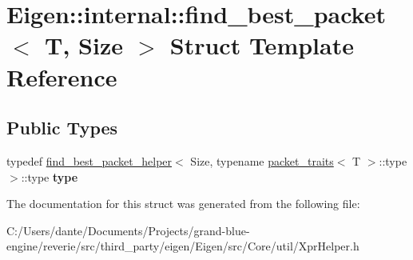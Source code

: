 \hypertarget{struct_eigen_1_1internal_1_1find__best__packet}{}\section{Eigen\+::internal\+::find\+\_\+best\+\_\+packet$<$ T, Size $>$ Struct Template Reference}
\label{struct_eigen_1_1internal_1_1find__best__packet}
\subsection*{Public Types}
\begin{DoxyCompactItemize}
\item 
\mbox{\label{struct_eigen_1_1internal_1_1find__best__packet_a323bedf4d5c5e4a2721d20708827c7ee}} 
typedef \mbox{\hyperlink{struct_eigen_1_1internal_1_1find__best__packet__helper}{find\+\_\+best\+\_\+packet\+\_\+helper}}$<$ Size, typename \mbox{\hyperlink{struct_eigen_1_1internal_1_1packet__traits}{packet\+\_\+traits}}$<$ T $>$\+::type $>$\+::type {\bfseries type}
\end{DoxyCompactItemize}


The documentation for this struct was generated from the following file\+:\begin{DoxyCompactItemize}
\item 
C\+:/\+Users/dante/\+Documents/\+Projects/grand-\/blue-\/engine/reverie/src/third\+\_\+party/eigen/\+Eigen/src/\+Core/util/Xpr\+Helper.\+h\end{DoxyCompactItemize}
